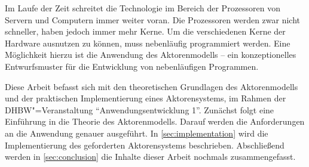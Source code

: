 Im Laufe der Zeit schreitet die Technologie im Bereich der Prozessoren von Servern und Computern immer weiter voran.
Die Prozessoren werden zwar nicht schneller, haben jedoch immer mehr Kerne.
Um die verschiedenen Kerne der Hardware ausnutzen zu können, muss nebenläufig programmiert werden.
Eine Möglichkeit hierzu ist die Anwendung des Aktorenmodells -- ein konzeptionelles Entwurfsmuster für die Entwicklung von nebenläufigen Programmen.

Diese Arbeit befasst sich mit den theoretischen Grundlagen des Aktorenmodells und der praktischen Implementierung eines Aktorensystems, im Rahmen der DHBW"=Veranstaltung \enquote{Anwendungsentwicklung 1}.
Zunächst folgt eine Einführung in die Theorie des Aktorenmodells.
Darauf werden die Anforderungen an die Anwendung genauer ausgeführt.
In \autoref{sec:implementation} wird die Implementierung des geforderten Aktorensystems beschrieben.
Abschließend werden in \autoref{sec:conclusion} die Inhalte dieser Arbeit nochmals zusammengefasst.
